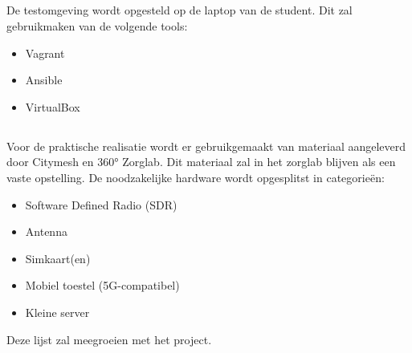 \subsection{}%
\label{sec:poc1}%
De testomgeving wordt opgesteld op de laptop van de student. Dit zal gebruikmaken van de volgende tools:

\begin{itemize}
    \item Vagrant
    \item Ansible
    \item VirtualBox
\end{itemize}

\subsection{}%
\label{sec:poc2}%

Voor de praktische realisatie wordt er gebruikgemaakt van materiaal aangeleverd door Citymesh en 360° Zorglab. Dit materiaal zal in het zorglab blijven als een vaste opstelling. De noodzakelijke hardware wordt opgesplitst in categorieën:

\begin{itemize}
    \item Software Defined Radio (SDR)
    \item Antenna
    \item Simkaart(en)
    \item Mobiel toestel (5G-compatibel)
    \item Kleine server
\end{itemize}

Deze lijst zal meegroeien met het project.

